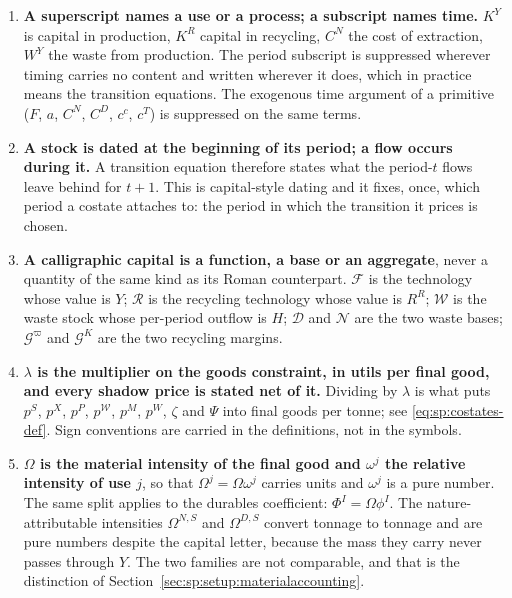 \begin{enumerate}
\item \textbf{A superscript names a use or a process; a subscript names time.} $K^Y$ is capital in
production, $K^R$ capital in recycling, $C^N$ the cost of extraction, $W^Y$ the waste from production.
The period subscript is suppressed wherever timing carries no content and written wherever it does,
which in practice means the transition equations. The exogenous time argument of a primitive
($F$, $a$, $C^N$, $C^D$, $c^c$, $c^T$) is suppressed on the same terms.

\item \textbf{A stock is dated at the beginning of its period; a flow occurs during it.} A transition
equation therefore states what the period-$t$ flows leave behind for $t+1$. This is capital-style
dating and it fixes, once, which period a costate attaches to: the period in which the transition it
prices is chosen.

\item \textbf{A calligraphic capital is a function, a base or an aggregate}, never a quantity of the
same kind as its Roman counterpart. $\mathcal F$ is the technology whose value is $Y$; $\mathcal R$ is
the recycling technology whose value is $R^R$; $\mathcal W$ is the waste stock whose per-period outflow
is $H$; $\mathcal D$ and $\mathcal N$ are the two waste bases; $\mathcal G^{\varpi}$ and
$\mathcal G^{K}$ are the two recycling margins.

\item \textbf{$\lambda$ is the multiplier on the goods constraint, in utils per final good, and every
shadow price is stated net of it.} Dividing by $\lambda$ is what puts $p^S$, $p^X$, $p^P$,
$p^{\mathcal W}$, $p^M$, $p^W$, $\zeta$ and $\Psi$ into final goods per tonne; see
\eqref{eq:sp:costates-def}. Sign conventions are carried in the definitions, not in the symbols.

\item \textbf{$\Omega$ is the material intensity of the final good and $\omega^j$ the relative
intensity of use $j$}, so that $\Omega^j=\Omega\omega^j$ carries units and $\omega^j$ is a pure number.
The same split applies to the durables coefficient: $\Phi^I=\Omega\phi^I$. The nature-attributable
intensities $\Omega^{N,S}$ and $\Omega^{D,S}$ convert tonnage to tonnage and are pure numbers despite
the capital letter, because the mass they carry never passes through $Y$. The two families are not
comparable, and that is the distinction of Section~\ref{sec:sp:setup:materialaccounting}.


\end{enumerate}

